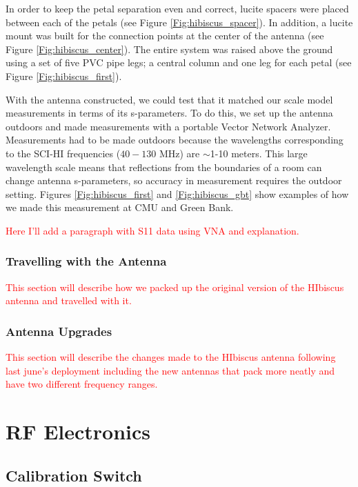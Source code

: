 In order to keep the petal separation even and correct, lucite spacers were placed between each of the petals (see Figure \ref{Fig:hibiscus_spacer}). In addition, a lucite mount was built for the connection points at the center of the antenna (see Figure \ref{Fig:hibiscus_center}). The entire system was raised above the ground using a set of five PVC pipe legs; a central column and one leg for each petal (see Figure \ref{Fig:hibiscus_first}). 

With the antenna constructed, we could test that it matched our scale model measurements in terms of its s-parameters. To do this, we set up the antenna outdoors and made measurements with a portable Vector Network Analyzer. Measurements had to be made outdoors because the wavelengths corresponding to the SCI-HI frequencies ($40-130$ MHz) are $\sim$1-10 meters. This large wavelength scale means that reflections from the boundaries of a room can change antenna s-parameters, so accuracy in measurement requires the outdoor setting. Figures \ref{Fig:hibiscus_first} and \ref{Fig:hibiscus_gbt} show examples of how we made this measurement at CMU and Green Bank.

\textcolor{red}{Here I'll add a paragraph with S11 data using VNA and explanation.}

\subsubsection{Travelling with the Antenna}

\textcolor{red}{This section will describe how we packed up the original version of the HIbiscus antenna and travelled with it.}

\subsubsection{Antenna Upgrades}

\textcolor{red}{This section will describe the changes made to the HIbiscus antenna following last june's deployment including the new antennas that pack more neatly and have two different frequency ranges.}

\section{RF Electronics}

\subsection{Calibration Switch}

